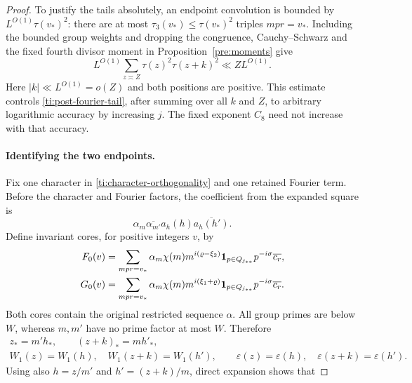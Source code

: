 \begin{proof}
To justify the tails absolutely, an endpoint convolution is bounded
by $L^{O(1)}\tau(v_*)^2$: there are at most
$\tau_3(v_*)\le\tau(v_*)^2$ triples $mpr=v_*$. Including the bounded
group weights and dropping the congruence, Cauchy--Schwarz and the
fixed fourth divisor moment in Proposition~\ref{pre:moments} give
\begin{equation}\label{ti:absolute-correlation}
 L^{O(1)}\sum_{z\asymp Z}\tau(z)^2\tau(z+k)^2
                         \ll ZL^{O(1)}.
\end{equation}
Here $|k|\ll L^{O(1)}=o(Z)$ and both positions are positive.
This estimate controls \eqref{ti:post-fourier-tail}, after summing
over all $k$ and $Z$, to arbitrary logarithmic accuracy by increasing
$j$. The fixed exponent $C_8$ need not increase with that accuracy.

\paragraph{Identifying the two endpoints.}
Fix one character in \eqref{ti:character-orthogonality} and one
retained Fourier term. Before the character and Fourier factors, the
coefficient from the expanded square is
\[
              \alpha_m\overline{\alpha_{m'}}
                        a_h(h)\overline{a_h(h')}.
\]
Define invariant cores, for positive integers $v$, by
\begin{equation}\label{ti:endpoint-cores}
 \begin{split}
 F_0(v)&=\sum_{mpr=v_*}\alpha_m\chi(m)
             m^{i(\varrho-\xi_2)}
             \mathbf{1}_{p\in Q_{j_{**}}}p^{-i\sigma}\overline{c_r},\\
 G_0(v)&=\sum_{mpr=v_*}\alpha_m\chi(m)
             m^{i(\xi_1+\varrho)}
             \mathbf{1}_{p\in Q_{j_{**}}}p^{-i\sigma}\overline{c_r}.
 \end{split}
\end{equation}
Both cores contain the original restricted sequence $\alpha$.
All group primes are below $W$, whereas $m,m'$ have no prime factor
at most $W$. Therefore
\begin{equation}\label{ti:group-identities}
 \begin{gathered}
 z_*=m'h_*,\qquad (z+k)_*=mh'_*,\\
 W_1(z)=W_1(h),\quad W_1(z+k)=W_1(h'),\qquad
 \varepsilon(z)=\varepsilon(h),\quad
 \varepsilon(z+k)=\varepsilon(h').
 \end{gathered}
\end{equation}
Using also $h=z/m'$ and $h'=(z+k)/m$, direct expansion shows that

\end{proof}
